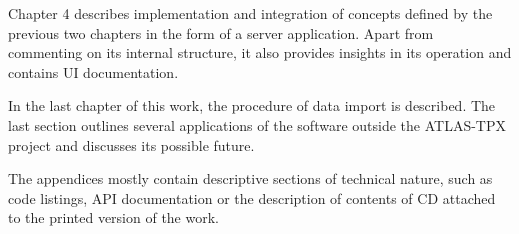 Chapter 4 describes implementation and integration of concepts defined by the previous two chapters in the form of a server application. Apart from commenting on its internal structure, it also provides insights in its operation and contains UI documentation.

In the last chapter of this work, the procedure of data import is described. The last section outlines several applications of the software outside the ATLAS-TPX project and discusses its possible future.

The appendices mostly contain descriptive sections of technical nature, such as code listings, API documentation or the description of contents of CD attached to the printed version of the work.
